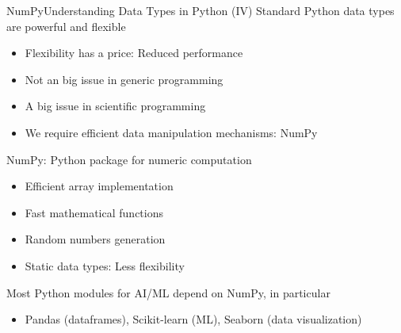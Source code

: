\documentclass[10pt,compress]{beamer} %
\begin{document}
\begin{frame}[fragile]{NumPy}{Understanding Data Types in Python (IV)}
	Standard Python data types are powerful and flexible
	\begin{itemize}
		\item Flexibility has a price: Reduced performance
		\item Not an big issue in generic programming
		\item A big issue in scientific programming
		\item We require efficient data manipulation mechanisms: NumPy
	\end{itemize}
	NumPy: Python package for numeric computation
	\begin{itemize}
		\item Efficient array implementation
		\item Fast mathematical functions
		\item Random numbers generation
		\item Static data types: Less flexibility
	\end{itemize}
	Most Python modules for AI/ML depend on NumPy, in particular
	\begin{itemize}
		\item Pandas (dataframes), Scikit-learn (ML), Seaborn (data visualization)
	\end{itemize}
\end{frame}
\end{document}
